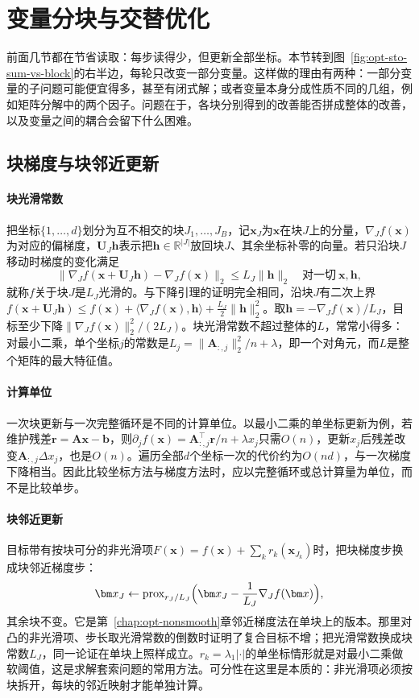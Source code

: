 \section{变量分块与交替优化}
\label{sec:opt-sto-block}

前面几节都在节省读取：每步读得少，但更新全部坐标。本节转到图~\ref{fig:opt-sto-sum-vs-block}的右半边，每轮只改变一部分变量。这样做的理由有两种：一部分变量的子问题可能便宜得多，甚至有闭式解；或者变量本身分成性质不同的几组，例如矩阵分解中的两个因子。问题在于，各块分别得到的改善能否拼成整体的改善，以及变量之间的耦合会留下什么困难。

\subsection{块梯度与块邻近更新}
\label{sec:opt-sto-block-gradient}

\paragraph{块光滑常数}
把坐标$\{1,\dots,d\}$划分为互不相交的块$J_1,\dots,J_B$，记$\bm x_J$为$\bm x$在块$J$上的分量，$\nabla_Jf(\bm x)$为对应的偏梯度，$\bm U_J\bm h$表示把$\bm h\in\mathbb R^{|J|}$放回块$J$、其余坐标补零的向量。若只沿块$J$移动时梯度的变化满足
\[
  \lVert\nabla_Jf(\bm x+\bm U_J\bm h)-\nabla_Jf(\bm x)\rVert_2\leq L_J\lVert\bm h\rVert_2\quad\text{对一切}\ \bm x,\bm h,
\]
就称$f$关于块$J$是$L_J$光滑的。与下降引理的证明完全相同，沿块$J$有二次上界$f(\bm x+\bm U_J\bm h)\leq f(\bm x)+\langle\nabla_Jf(\bm x),\bm h\rangle+\tfrac{L_J}2\lVert\bm h\rVert_2^2$。取$\bm h=-\nabla_Jf(\bm x)/L_J$，目标至少下降$\lVert\nabla_Jf(\bm x)\rVert_2^2/(2L_J)$。块光滑常数不超过整体的$L$，常常小得多：对最小二乘，单个坐标$j$的常数是$L_j=\lVert\bm A_{:,j}\rVert_2^2/n+\lambda$，即一个对角元，而$L$是整个矩阵的最大特征值。

\paragraph{计算单位}
一次块更新与一次完整循环是不同的计算单位。以最小二乘的单坐标更新为例，若维护残差$\bm r=\bm A\bm x-\bm b$，则$\partial_jf(\bm x)=\bm A_{:,j}^\top\bm r/n+\lambda x_j$只需$O(n)$，更新$x_j$后残差改变$\bm A_{:,j}\Delta x_j$，也是$O(n)$。遍历全部$d$个坐标一次的代价约为$O(nd)$，与一次梯度下降相当。因此比较坐标方法与梯度方法时，应以完整循环或总计算量为单位，而不是比较单步。

\paragraph{块邻近更新}
目标带有按块可分的非光滑项$F(\bm x)=f(\bm x)+\sum_kr_k(\bm x_{J_k})$时，把块梯度步换成块邻近梯度步：
\[
  \bm x_J\gets\operatorname{prox}_{r_J/L_J}\Bigl(\bm x_J-\frac1{L_J}\nabla_Jf(\bm x)\Bigr),
\]
其余块不变。它是第~\ref{chap:opt-nonsmooth}章邻近梯度法在单块上的版本。那里对凸的非光滑项、步长取光滑常数的倒数时证明了复合目标不增；把光滑常数换成块常数$L_J$，同一论证在单块上照样成立。$r_k=\lambda_1|\cdot|$的单坐标情形就是对最小二乘做软阈值，这是求解套索问题的常用方法。可分性在这里是本质的：非光滑项必须按块拆开，每块的邻近映射才能单独计算。

